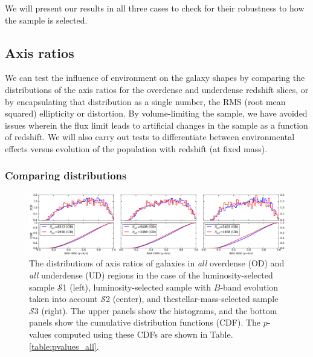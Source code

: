 \documentclass[twocolumn,useAMS,usenatbib]{mn2e}
\newcommand{\s}{\ensuremath{\mathcal{S}}}
\begin{document}
We will present our results in all three cases to check for their
robustness to how the sample is selected. 

\subsection{Axis ratios} 

We can test the influence of environment on the galaxy shapes by
comparing the distributions of the axis ratios for the overdense and
underdense redshift slices, or by encapsulating that distribution as a
single number, the RMS (root mean squared) ellipticity or distortion. By
volume-limiting the sample, we have avoided issues
wherein the flux limit leads to artificial changes in the sample as a
function of redshift.  We will also carry out tests to differentiate
between environmental effects versus evolution of the population with
redshift (at fixed mass).

\subsubsection{Comparing distributions}
\label{subsubsec:compdist}
\begin{figure}
 \centering
 \includegraphics[width=2.2\columnwidth]{axis_ratio_all.eps}
 \caption{The distributions of axis ratios of galaxies in \emph{all}
   overdense (OD) and \emph{all} underdense (UD) regions in the case
   of the luminosity-selected sample \s1 (left), luminosity-selected
   sample with $B$-band evolution taken into account \s2 (center), and
   thestellar-mass-selected sample \s3 (right). The upper panels show
   the histograms, 
 and the bottom panels show the cumulative distribution functions
 (CDF). The $p$-values computed using these CDFs are shown in Table. \ref{table:pvalues_all}.}
 \label{fig:axisratio_all}
\end{figure}
\end{document}
